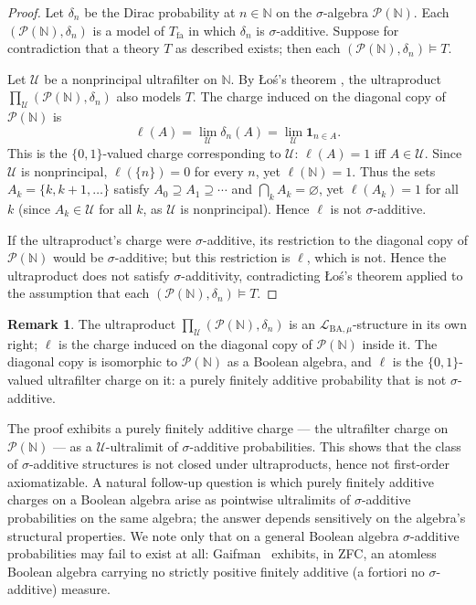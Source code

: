 \documentclass[11pt]{article}
\theoremstyle{definition}
\newtheorem{remark}[proposition]{Remark}
\newcommand{\Lmu}{\mathcal{L}_{\mathrm{BA},\mu}}
\newcommand{\Tfa}{T_{\mathrm{fa}}}
\newcommand{\N}{\mathbb{N}}
\begin{document}
\begin{proof}
Let $\delta_n$ be the Dirac probability at $n \in \N$ on the $\sigma$-algebra
$\mathcal{P}(\N)$.  Each $(\mathcal{P}(\N), \delta_n)$ is a model of $\Tfa$ in
which $\delta_n$ is $\sigma$-additive.  Suppose for contradiction that a theory
$T$ as described exists; then each $(\mathcal{P}(\N), \delta_n) \models T$.

Let $\mathcal{U}$ be a nonprincipal ultrafilter on $\N$.  By \L{}o\'{s}'s
theorem \cite{Los1955}, the ultraproduct
$\prod_\mathcal{U}(\mathcal{P}(\N),\delta_n)$ also models $T$.  The charge
induced on the diagonal copy of $\mathcal{P}(\N)$ is
\[
  \ell(A) = \lim_\mathcal{U} \delta_n(A) = \lim_\mathcal{U} \mathbf{1}_{n \in A}.
\]
This is the $\{0,1\}$-valued charge corresponding to $\mathcal{U}$: $\ell(A) = 1$
iff $A \in \mathcal{U}$.  Since $\mathcal{U}$ is nonprincipal, $\ell(\{n\}) = 0$
for every $n$, yet $\ell(\N) = 1$.  Thus the sets $A_k = \{k, k+1, \ldots\}$
satisfy $A_0 \supseteq A_1 \supseteq \cdots$ and $\bigcap_k A_k = \varnothing$,
yet $\ell(A_k) = 1$ for all $k$ (since $A_k \in \mathcal{U}$ for all $k$, as
$\mathcal{U}$ is nonprincipal).  Hence $\ell$ is not $\sigma$-additive.

If the ultraproduct's charge were $\sigma$-additive, its restriction to the
diagonal copy of $\mathcal{P}(\N)$ would be $\sigma$-additive; but this
restriction is $\ell$, which is not.  Hence the ultraproduct does not satisfy
$\sigma$-additivity, contradicting \L{}o\'{s}'s theorem applied to the
assumption that each $(\mathcal{P}(\N), \delta_n) \models T$.
\end{proof}

\begin{remark}
The ultraproduct $\prod_\mathcal{U}(\mathcal{P}(\N),\delta_n)$ is an
$\Lmu$-structure in its own right; $\ell$ is the charge induced on the diagonal
copy of $\mathcal{P}(\N)$ inside it.  The diagonal copy is isomorphic to
$\mathcal{P}(\N)$ as a Boolean algebra, and $\ell$ is the $\{0,1\}$-valued
ultrafilter charge on it: a purely finitely additive probability that is not
$\sigma$-additive.
\end{remark}

\medskip

The proof exhibits a purely finitely additive charge --- the ultrafilter charge on
$\mathcal{P}(\N)$ --- as a $\mathcal{U}$-ultralimit of $\sigma$-additive
probabilities.  This shows that the class of $\sigma$-additive structures is not
closed under ultraproducts, hence not first-order axiomatizable.  A natural
follow-up question is which purely finitely additive charges on a Boolean algebra
arise as pointwise ultralimits of $\sigma$-additive probabilities on the same
algebra; the answer depends sensitively on the algebra's structural properties.
We note only that on a general Boolean algebra $\sigma$-additive probabilities may
fail to exist at all: Gaifman~\cite{Gaifman1964} exhibits, in ZFC, an atomless
Boolean algebra carrying no strictly positive finitely additive (a fortiori no
$\sigma$-additive) measure.



\end{document}
